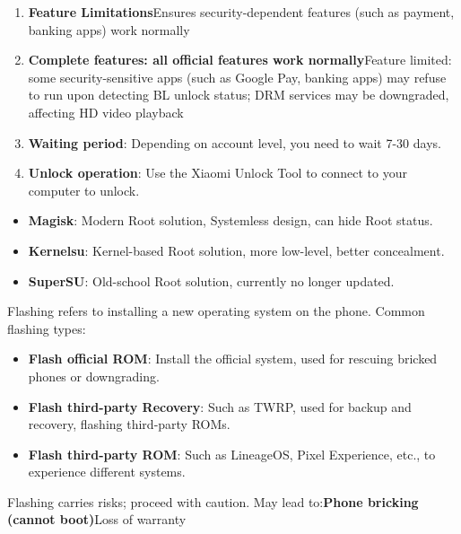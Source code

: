 
\begin{enumerate}
  \item \textbf{Feature Limitations}Ensures security-dependent features (such as payment, banking apps) work normally
  \item \textbf{Complete features: all official features work normally}Feature limited: some security-sensitive apps (such as Google Pay, banking apps) may refuse to run upon detecting BL unlock status; DRM services may be downgraded, affecting HD video playback
  \item \textbf{Waiting period}: Depending on account level, you need to wait 7-30 days.
  \item \textbf{Unlock operation}: Use the Xiaomi Unlock Tool to connect to your computer to unlock.
\end{enumerate}


\begin{itemize}
  \item \textbf{Magisk}: Modern Root solution, Systemless design, can hide Root status.
  \item \textbf{Kernelsu}: Kernel-based Root solution, more low-level, better concealment.
  \item \textbf{SuperSU}: Old-school Root solution, currently no longer updated.
\end{itemize}


Flashing refers to installing a new operating system on the phone. Common flashing types:

\begin{itemize}
  \item \textbf{Flash official ROM}: Install the official system, used for rescuing bricked phones or downgrading.
  \item \textbf{Flash third-party Recovery}: Such as TWRP, used for backup and recovery, flashing third-party ROMs.
  \item \textbf{Flash third-party ROM}: Such as LineageOS, Pixel Experience, etc., to experience different systems.
\end{itemize}


Flashing carries risks; proceed with caution. May lead to:\textbf{Phone bricking (cannot boot)}Loss of warranty

